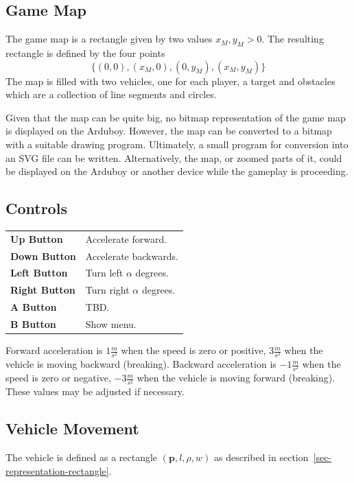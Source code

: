 \documentclass[11pt]{article}
\newcommand{\pb}{\mathbf{p}}
\newcommand{\mssq}{\frac{m}{s^2}}
\begin{document}
\subsection{Game Map}
\label{sec-game-map}
The game map is a rectangle given by two values $x_M, y_M > 0$. The resulting
rectangle is defined by the four points
\begin{equation*}
    \{(0,0), (x_M, 0), (0, y_M), (x_M, y_M)\}
\end{equation*}
The map is filled with two vehicles, one for each player, a target and
obstacles which are a collection of line segments and circles.

Given that the map can be quite big, no bitmap representation of the game map
is displayed on the Arduboy. However, the map can be converted to a bitmap
with a suitable drawing program. Ultimately, a small program for conversion
into an SVG file can be written. Alternatively, the map, or zoomed parts of it,
could be displayed on the Arduboy or another device while the gameplay is
proceeding.

\subsection{Controls}
\label{sec-controls}

\begin{tabular}{>{\sffamily\bfseries}ll}
    Up Button & Accelerate forward. \\
    Down Button & Accelerate backwards.\\
    Left Button & Turn left $\alpha$ degrees.\\
    Right Button & Turn right $\alpha$ degrees.\\
    A Button & TBD.\\
    B Button & Show menu.\\
\end{tabular}

Forward acceleration is $1\mssq$ when the speed is zero or positive,
$3\mssq$ when the vehicle is moving backward (breaking).
Backward acceleration is $-1\mssq$ when the speed is zero or negative,
$-3\mssq$ when the vehicle is moving forward (breaking).
These values may be adjusted if necessary.

\subsection{Vehicle Movement}
\label{sec-vehicle-movement}

The vehicle is defined as a rectangle $(\pb, l, \rho, w)$ as described in
section~\ref{sec-representation-rectangle}.
\end{document}
